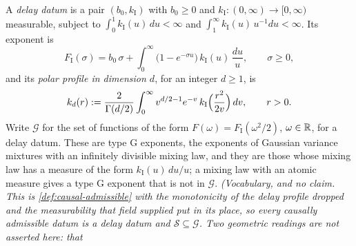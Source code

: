 \begin{definition}
\label{def:delay-data}
\leanok
A \emph{delay datum} is a pair $(b_0, k_{\mathrm I})$ with $b_0 \ge 0$ and
$k_{\mathrm I} : (0,\infty) \to [0,\infty)$ measurable, subject to
$\int_0^1 k_{\mathrm I}(u)\,du < \infty$ and $\int_1^\infty k_{\mathrm I}(u)\,u^{-1}du < \infty$.
Its exponent is
\[
  F_{\mathrm I}(\sigma) = b_0\,\sigma
   + \int_0^\infty \bigl(1 - e^{-\sigma u}\bigr)\,k_{\mathrm I}(u)\,\frac{du}{u},
  \qquad \sigma \ge 0 ,
\]
and its \emph{polar profile in dimension $d$}, for an integer $d \ge 1$, is
\begin{equation}\label{eq:polar-profile}
  k_d(r) := \frac{2}{\Gamma(d/2)}\int_0^\infty v^{d/2-1}e^{-v}\,
   k_{\mathrm I}\Bigl(\frac{r^2}{2v}\Bigr)\,dv, \qquad r > 0 .
\end{equation}
Write $\mathcal{G}$ for the set of functions of the form $F(\omega) = F_{\mathrm I}(\omega^2/2)$,
$\omega \in \mathbb{R}$, for a delay datum. These are type G exponents, the exponents of Gaussian
variance mixtures with an infinitely divisible mixing law, and they are those whose mixing law
has a \Levy{} measure of the form $k_{\mathrm I}(u)\,du/u$; a mixing law with an atomic \Levy{}
measure gives a type G exponent that is not in $\mathcal{G}$.
\statusT\quad\emph{(Vocabulary, and no claim. This is \ref{def:causal-admissible} with the
monotonicity of the delay profile dropped and the measurability that field supplied put in its
place, so every causally admissible datum is a delay datum and
$\mathcal{S} \subseteq \mathcal{G}$. Two geometric readings are not asserted here: that
}
\end{definition}
